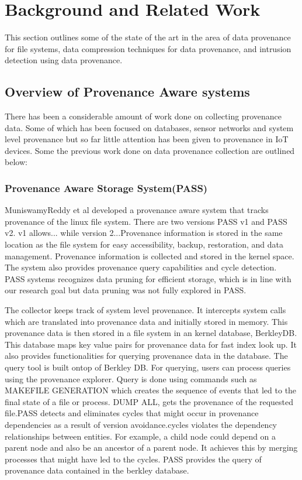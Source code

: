
\chapter{Background and Related Work}\label{background}

This section outlines some of the state of the art in the area of data provenance for file systems, data compression techniques for data provenance, and intrusion detection using data provenance.

\section{Overview of Provenance Aware systems}

There has been a considerable amount of work done on collecting provenance data. Some of which has been focused on databases, sensor networks and system level provenance but so far little attention has been given to provenance in IoT devices. Some the previous work done on data provenance collection are outlined below:

\subsection{Provenance Aware Storage System(PASS)}
MuniswamyReddy
et al developed a provenance aware system that tracks provenance of the linux file system. There are two versions PASS v1 and PASS v2. v1 allows... while version 2...Provenance information
is stored in the same location as the file system for easy accessibility, backup,
restoration, and data management. Provenance information is collected and stored in
the kernel space. The system also provides provenance query capabilities and cycle
detection. PASS systems recognizes data pruning for efficient storage, which is in line
with our research goal but data pruning was not fully explored in PASS.

The collector keeps track of system level provenance. It intercepts system calls which are translated into provenance data and initially stored in memory. This provenance data is then stored in a file system in an kernel database, BerkleyDB. This database maps key value pairs for provenance data for fast index look up. It also provides functionalities for querying provenance data in the database. The query tool is built ontop of Berkley DB. For querying, users can process queries using the provenance explorer. Query is done using commands such as MAKEFILE  GENERATION which creates the sequence of events that led to the final state of a file or process. DUMP ALL, gets the provenance of the requested file.PASS detects and eliminates cycles that might occur in provenance dependencies as a result of version avoidance.cycles violates the dependency relationships between entities. For example, a child node could depend on a parent node and also be an ancestor of a parent node. It achieves this by merging processes that might have led to the cycles. PASS provides the query of provenance data contained in the berkley database.

